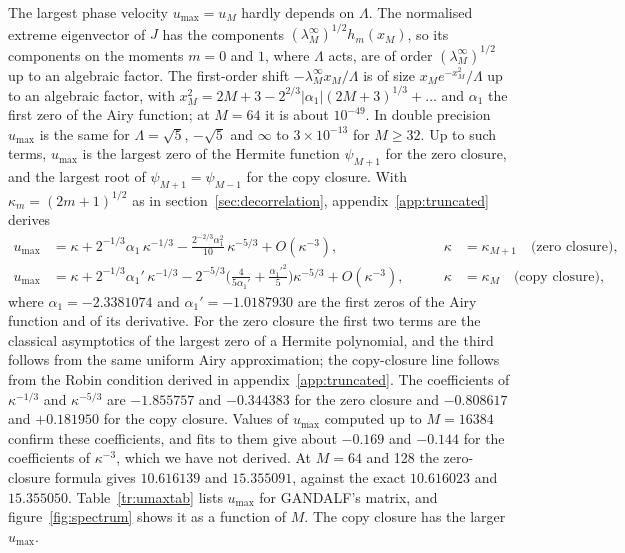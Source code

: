 The largest phase velocity $u_{\max}=u_M$ hardly depends on $\Lambda$. The normalised extreme eigenvector of $J$ has the components $(\lambda^\infty_M)^{1/2}h_m(x_M)$, so its components on the moments $m=0$ and $1$, where $\Lambda$ acts, are of order $(\lambda^\infty_M)^{1/2}$ up to an algebraic factor. The first-order shift $-\lambda^\infty_Mx_M/\Lambda$ is of size $x_Me^{-x_M^2}/\Lambda$ up to an algebraic factor, with $x_M^2=2M+3-2^{2/3}|\alpha_1|(2M+3)^{1/3}+\dots$ and $\alpha_1$ the first zero of the Airy function; at $M=64$ it is about $10^{-49}$. In double precision $u_{\max}$ is the same for $\Lambda=\sqrt5$, $-\sqrt5$ and $\infty$ to $3\times10^{-13}$ for $M\ge32$. Up to such terms, $u_{\max}$ is the largest zero of the Hermite function $\psi_{M+1}$ for the zero closure, and the largest root of $\psi_{M+1}=\psi_{M-1}$ for the copy closure. With $\kappa_m=(2m+1)^{1/2}$ as in section~\ref{sec:decorrelation}, appendix~\ref{app:truncated} derives
\begin{equation}\label{eq:umax}
\begin{aligned}
  u_{\max}&=\kappa+2^{-1/3}\alpha_1\,\kappa^{-1/3}-\frac{2^{-2/3}\alpha_1^2}{10}\,\kappa^{-5/3}+O(\kappa^{-3}),&\qquad\kappa&=\kappa_{M+1}\quad\text{(zero closure)},\\
  u_{\max}&=\kappa+2^{-1/3}\alpha_1'\,\kappa^{-1/3}-2^{-5/3}\Big(\frac{4}{5\alpha_1'}+\frac{\alpha_1'^2}{5}\Big)\kappa^{-5/3}+O(\kappa^{-3}),&\qquad\kappa&=\kappa_M\quad\text{(copy closure)},
\end{aligned}
\end{equation}
where $\alpha_1=-2.3381074$ and $\alpha_1'=-1.0187930$ are the first zeros of the Airy function and of its derivative. For the zero closure the first two terms are the classical asymptotics of the largest zero of a Hermite polynomial, and the third follows from the same uniform Airy approximation; the copy-closure line follows from the Robin condition derived in appendix~\ref{app:truncated}. The coefficients of $\kappa^{-1/3}$ and $\kappa^{-5/3}$ are $-1.855757$ and $-0.344383$ for the zero closure and $-0.808617$ and $+0.181950$ for the copy closure. Values of $u_{\max}$ computed up to $M=16384$ confirm these coefficients, and fits to them give about $-0.169$ and $-0.144$ for the coefficients of $\kappa^{-3}$, which we have not derived. At $M=64$ and 128 the zero-closure formula gives $10.616139$ and $15.355091$, against the exact $10.616023$ and $15.355050$. Table~\ref{tr:umaxtab} lists $u_{\max}$ for GANDALF's matrix, and figure~\ref{fig:spectrum} shows it as a function of $M$. The copy closure has the larger $u_{\max}$.

